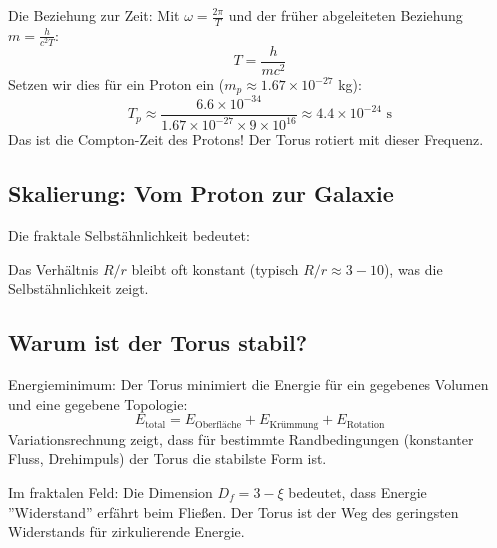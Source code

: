 	Die Beziehung zur Zeit:
	Mit \( \omega = \frac{2\pi}{T} \) und der früher abgeleiteten Beziehung \( m = \frac{h}{c^2 T} \):
	\[
	T = \frac{h}{mc^2}
	\]
	Setzen wir dies für ein Proton ein (\( m_p \approx 1.67 \times 10^{-27} \) kg):
	\[
	T_p \approx \frac{6.6 \times 10^{-34}}{1.67 \times 10^{-27} \times 9 \times 10^{16}} \approx 4.4 \times 10^{-24} \text{ s}
	\]
	Das ist die Compton-Zeit des Protons! Der Torus rotiert mit dieser Frequenz.
	
	\subsection{Skalierung: Vom Proton zur Galaxie}
	Die fraktale Selbstähnlichkeit bedeutet:
	\begin{table}[H]
		\centering
	\end{table}
	Das Verhältnis \( R/r \) bleibt oft konstant (typisch \( R/r \approx 3-10 \)), was die Selbstähnlichkeit zeigt.
	
	\subsection{Warum ist der Torus stabil?}
	Energieminimum:
	Der Torus minimiert die Energie für ein gegebenes Volumen und eine gegebene Topologie:
	\[
	E_{\text{total}} = E_{\text{Oberfläche}} + E_{\text{Krümmung}} + E_{\text{Rotation}}
	\]
	Variationsrechnung zeigt, dass für bestimmte Randbedingungen (konstanter Fluss, Drehimpuls) der Torus die stabilste Form ist.
	
	Im fraktalen Feld:
	Die Dimension \( D_f = 3 - \xi \) bedeutet, dass Energie ''Widerstand'' erfährt beim Fließen. Der Torus ist der Weg des geringsten Widerstands für zirkulierende Energie.
	
